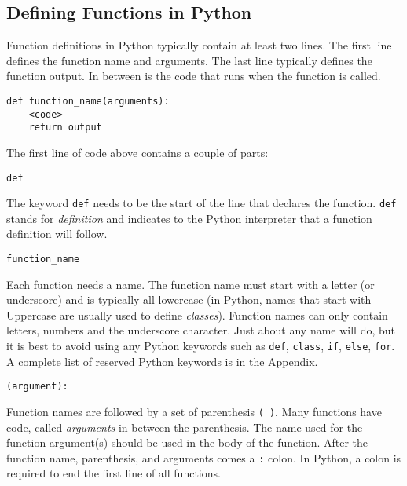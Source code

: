 \documentclass{book}
\newcommand{\passthrough}[1]{#1}
\begin{document}
    
        \hypertarget{defining-functions-in-python}{%
\subsection{Defining Functions in
Python}\label{defining-functions-in-python}}
    




    
        Function definitions in Python typically contain at least two lines. The
first line defines the function name and arguments. The last line
typically defines the function output. In between is the code that runs
when the function is called.

\begin{lstlisting}
def function_name(arguments):
    <code>
    return output
\end{lstlisting}

The first line of code above contains a couple of parts:

\begin{lstlisting}
def
\end{lstlisting}

The keyword \passthrough{\lstinline!def!} needs to be the start of the
line that declares the function. \passthrough{\lstinline!def!} stands
for \emph{definition} and indicates to the Python interpreter that a
function definition will follow.

\begin{lstlisting}
function_name
\end{lstlisting}

Each function needs a name. The function name must start with a letter
(or underscore) and is typically all lowercase (in Python, names that
start with Uppercase are usually used to define \emph{classes}).
Function names can only contain letters, numbers and the underscore
character. Just about any name will do, but it is best to avoid using
any Python keywords such as \passthrough{\lstinline!def!},
\passthrough{\lstinline!class!}, \passthrough{\lstinline!if!},
\passthrough{\lstinline!else!}, \passthrough{\lstinline!for!}. A
complete list of reserved Python keywords is in the Appendix.

\begin{lstlisting}
(argument):
\end{lstlisting}

Function names are followed by a set of parenthesis
\passthrough{\lstinline!( )!}. Many functions have code, called
\emph{arguments} in between the parenthesis. The name used for the
function argument(s) should be used in the body of the function. After
the function name, parenthesis, and arguments comes a
\passthrough{\lstinline!:!} colon. In Python, a colon is required to end
the first line of all functions.
\end{document}
